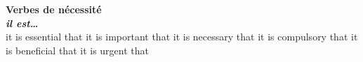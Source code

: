 {\sffamily\bfseries Verbes de nécessité}\\
     {\bf {\em il est\ldots}}\\
   {it is essential that}
   {it is important that}
   {it is necessary that}
   {it is compulsory that}
    {it is beneficial that}
   {it is urgent that}
